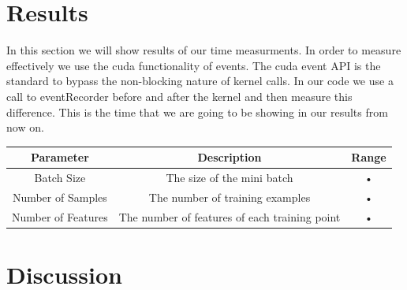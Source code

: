 \documentclass[11pt,a4paper]{article}
\begin{document}
\section{Results}
In this section we will show results of our time measurments. In order to measure effectively we
use the cuda functionality of events. The cuda event API is the standard to bypass the non-blocking
nature of kernel calls. In our code we use a call to eventRecorder before and after the kernel and
then measure this difference. This is the time that we are going to be showing in our results from
now on.

\begin{tabular}{|c|c|c|}
\hline
Parameter & Description & Range \\
\hline
Batch Size & The size of the mini batch & • \\
\hline
Number of Samples & The number of training examples & • \\
\hline
Number of Features & The number of features of each training point & • \\
\hline
\end{tabular}

\section{Discussion}



\end{document}
